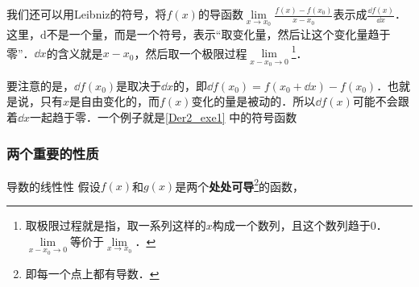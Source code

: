 我们还可以用Leibniz的符号，将$f(x)$的导函数$\lim\limits_{x\to x_0}\frac{f(x)-f(x_0)}{x-x_0}$表示成$\frac{\dd f(x)}{\dd x}$．这里，$\mathrm{d}$不是一个量，而是一个符号，表示“取变化量，然后让这个变化量趋于零”．$\dd x$的含义就是$x-x_0$，然后取一个极限过程$\lim\limits_{x-x_0\to 0}$\footnote{取极限过程就是指，取一系列这样的$x$构成一个数列，且这个数列趋于$0$．$\lim\limits_{x-x_0\to 0}$等价于$\lim\limits_{x\to x_0}$．}．

要注意的是，$\dd f(x_0)$是取决于$\dd x$的，即$\dd f(x_0)=f(x_0+\dd x)-f(x_0)$．也就是说，只有$x$是自由变化的，而$f(x)$变化的量是被动的．所以$\dd f(x)$可能不会跟着$\dd x$一起趋于零．一个例子就是\autoref{Der2_exe1} 中的符号函数





\subsubsection{两个重要的性质}

\begin{theorem}{导数的线性性}
假设$f(x)$和$g(x)$是两个\textbf{处处可导}\footnote{即每一个点上都有导数．}的函数，
\end{theorem}





